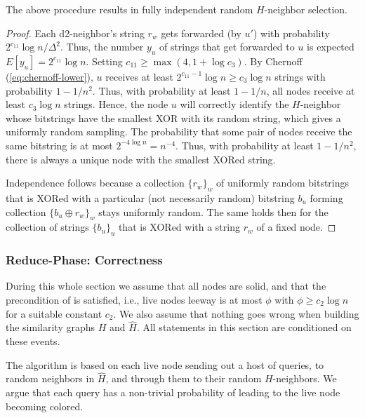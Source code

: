 \begin{lemma}
The above procedure results in fully independent random $H$-neighbor selection.
\label{L:rand-nbor}
\end{lemma}
\begin{proof}
Each d2-neighbor's string $r_w$ gets forwarded (by $u'$) with probability $2^{c_{11}}\log n / \Delta^2$. Thus, the number  $y_{u}$ of strings that get forwarded to $u$ is expected $E[y_u] = 2^{c_{11}} \log n$. Setting $c_{11} \ge \max(4, 1+\log c_3)$.
By Chernoff (\ref{eq:chernoff-lower}), $u$ receives at least $2^{c_{11}-1} \log n \ge c_3 \log n$ strings with probability $1-1/n^2$.
Thus, with probability at least $1-1/n$, all nodes receive at least $c_3 \log n$ strings.
Hence, the node $u$ will correctly identify the $H$-neighbor whose bitstrings have the smallest XOR with its random string, which gives a uniformly random sampling.
The probability that some pair of nodes receive the same bitstring is at most $2^{-4\log n} = n^{-4}$. Thus, with probability at least $1-1/n^2$, there is always a unique node with the smallest XORed string.

Independence follows because a collection $\{r_w\}_w$ of uniformly random bitstrings that is XORed with a particular (not necessarily random) bitstring $b_u$ forming collection $\{ b_u \oplus r_w\}_w$ stays uniformly random.
The same holds then for the collection of strings $\{b_u\}_u$
that is XORed with a string $r_w$ of a fixed node.
\end{proof}


\subsubsection{Reduce-Phase: Correctness}
During this whole section we assume that all nodes are solid, and that the precondition of  is satisfied, i.e., live nodes leeway is at most $\phi$ with $\phi\geq c_2\log n$ for a suitable constant $c_2$. 
We also assume that nothing goes wrong when building the similarity graphs $H$ and $\hat{H}$.
All statements in this section are conditioned on these events.

The algorithm is based on each live node sending out a host of queries, to random neighbors in $\hat{H}$, and through them to their random $H$-neighbors. We argue that each query has a non-trivial %
probability of leading to the live node becoming colored.

